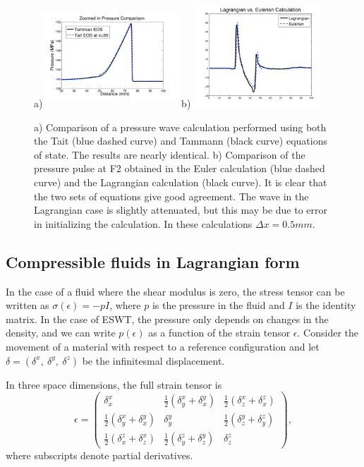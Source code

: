 \documentclass{article}
\begin{document}
\begin{figure}
\begin{center}
a)\includegraphics[height=1.5in, width=2in]{pressure_comp_zoom.pdf}
b)\includegraphics[height=1.5in, width=2in]{lagrangian_eulerian.pdf}
\caption{a) Comparison of a pressure wave calculation performed using both the Tait (blue dashed curve) and Tammann (black curve) 
equations of state.  The results are nearly identical.  b) Comparison of the pressure pulse at F2 obtained 
in the Euler calculation (blue dashed curve) and the Lagrangian calculation (black curve).  It is clear that 
the two sets of equations give good agreement.  The wave in the Lagrangian case is slightly attenuated, 
but this may be due to error in initializing the calculation. In these calculations $\Delta x = 0.5 mm$.}
\label{fig:tait_tammann}
\end{center}
\end{figure}


\subsection{Compressible fluids in Lagrangian form} \label{sec:lagrangian}
In the case of a fluid where the shear modulus is zero, the stress tensor can be written as 
$\sigma(\epsilon) = -pI$, where $p$ is the pressure in the fluid and $I$ is the identity matrix.  
In the case of 
ESWT, the pressure only depends on changes in the density, and we can write $p(\epsilon)$ as a function 
of the strain tensor $\epsilon$.  Consider the movement of a material with
respect to a reference configuration and let $\delta = (\delta^x,~\delta^y,~\delta^z)$ be the
infinitesmal displacement.  

In three space dimensions, the full strain tensor is 
\begin{equation}
\epsilon = \left(\begin{array}{ccc} \delta^x_x & \frac{1}{2} (\delta^x_y + \delta^y_x) & \frac{1}{2} (\delta^x_z + \delta^z_x) \\
\frac{1}{2} (\delta^x_y + \delta^y_x) & \delta^y_y & \frac{1}{2} (\delta^y_z + \delta^z_y) \\
 \frac{1}{2} (\delta^z_x + \delta^x_z) & \frac{1}{2} (\delta^z_y + \delta^y_z) & \delta^z_z
 \end{array}
\right),
\end{equation}
where subscripts denote partial derivatives.
\end{document}
